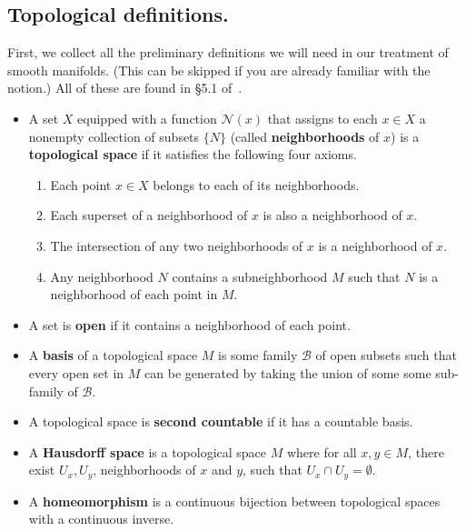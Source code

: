 \documentclass[12pt]{article}
\theoremstyle{definition}
\theoremstyle{definition}
\theoremstyle{definition}
\theoremstyle{definition}
\theoremstyle{definition}
\theoremstyle{definition}
\theoremstyle{definition}
\theoremstyle{definition}
\begin{document}
\subsection{Topological definitions.}

\par{First, we collect all the preliminary
definitions we will need in our treatment of
smooth manifolds. (This can be skipped if you are
already familiar with the notion.) All of these
are found in §5.1 of~\cite{Tu}.}

\begin{itemize}[noitemsep,topsep=0pt]
\item {A set $X$ equipped with a function
$\mathcal{N}(x)$ that assigns to each $x \in X$ a
nonempty collection of subsets $\{N\}$ (called
\textbf{neighborhoods} of $x$) is a
\textbf{topological space} if it satisfies the
following four axioms.
    \begin{enumerate}[noitemsep,topsep=0pt]
    \item {Each point $x \in X$  belongs to each
    of its neighborhoods.}
    \item {Each superset of a neighborhood of $x$
    is also a neighborhood of $x$.}
    \item {The intersection of any two
    neighborhoods of $x$ is a neighborhood of
    $x$.}
    \item {Any neighborhood $N$ contains a
    subneighborhood $M$ such that $N$ is a
        neighborhood of each point in $M$.}
    \end{enumerate}}

\item {A set is \textbf{open} if it contains a
neighborhood of each point.} 

\item {A \textbf{basis} of a topological space
$M$ is some family $\mathcal{B}$ of open subsets
such that every open set in $M$ can be generated
by taking the union of some some sub-family of
$\mathcal{B}$.}

\item {A topological space is \textbf{second countable}
if it has a countable basis.}

\item {A \textbf{Hausdorff space} is a topological
space $M$ where for all $x, y \in M$, there exist
$U_x, U_y$, neighborhoods of $x$ and $y$, such that
$U_x \cap U_y = \emptyset$.}

\item {A \textbf{homeomorphism} is a continuous
bijection between topological spaces with a
continuous inverse.}


\end{itemize}
\end{document}
